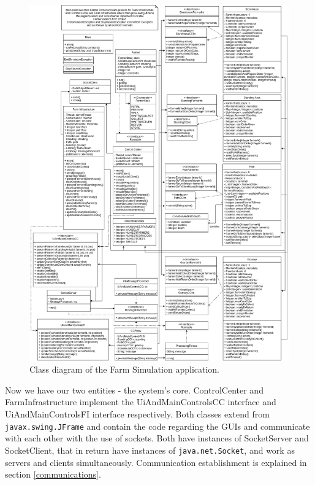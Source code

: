 \documentclass[12pt]{article}
\begin{document}
\begin{figure}[H]
  \centering
  \begin{minipage}{1.05\textwidth}
    \centering
    \includegraphics[width=\linewidth]{FarmSimulation_ClassDiagram.png}
  \end{minipage}%
  \caption{Class diagram of the Farm Simulation application.}
  \label{class_diagram}
\end{figure} 

Now we have our two entities - the system's core.
ControlCenter and FarmInfrastructure implement the UiAndMainControlsCC interface and UiAndMainControlsFI interface respectively.
Both classes extend from \texttt{javax.swing.JFrame} and contain the code regarding the GUIs and communicate with each other with the use of sockets.
Both have instances of SocketServer and SocketClient, that in return have instances of \texttt{java.net.Socket}, and work as servers and clients simultaneously.
Communication establishment is explained in section \ref{communications}.
\end{document}
